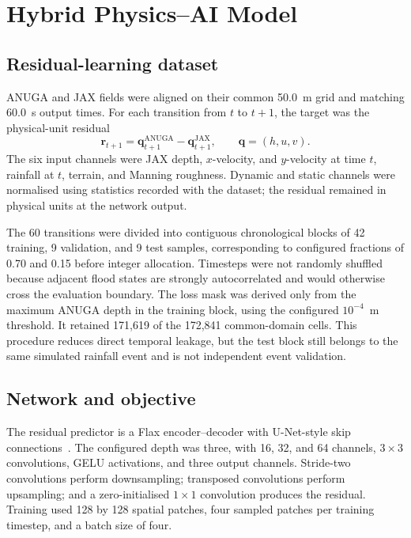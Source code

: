 \section{Hybrid Physics--AI Model}
\label{sec:hybrid-model}

\subsection{Residual-learning dataset}

ANUGA and JAX fields were aligned on their common 50.0~m grid and matching
60.0~s output times.  For each transition from \(t\) to \(t+1\), the target
was the physical-unit residual
\[
  \mathbf{r}_{t+1}
  = \mathbf{q}^{\mathrm{ANUGA}}_{t+1}
  - \mathbf{q}^{\mathrm{JAX}}_{t+1},
  \qquad
  \mathbf{q}=(h,u,v).
\]
The six input channels were JAX depth, \(x\)-velocity, and \(y\)-velocity at
time \(t\), rainfall at \(t\), terrain, and Manning roughness.  Dynamic and
static channels were normalised using statistics recorded with the dataset;
the residual remained in physical units at the network output.

The 60 transitions were divided into contiguous chronological blocks of 42
training, 9 validation, and 9 test samples, corresponding to configured
fractions of 0.70 and 0.15 before integer allocation.  Timesteps were not
randomly shuffled because adjacent flood states are strongly autocorrelated
and would otherwise cross the evaluation boundary.  The loss mask was derived
only from the maximum ANUGA depth in the training block, using the configured
\(10^{-4}\)~m threshold.  It retained 171,619 of the 172,841 common-domain
cells.  This procedure reduces direct temporal leakage, but the test block
still belongs to the same simulated rainfall event and is not independent
event validation.

\subsection{Network and objective}

The residual predictor is a Flax encoder--decoder with U-Net-style skip
connections~\cite{RonnebergerEtAl2015}.  The configured depth was three, with
16, 32, and 64 channels, \(3\times3\) convolutions, GELU activations, and
three output channels.  Stride-two convolutions perform downsampling;
transposed convolutions perform upsampling; and a zero-initialised
\(1\times1\) convolution produces the residual.  Training used
128 by 128 spatial patches, four sampled patches per training timestep, and a
batch size of four.

